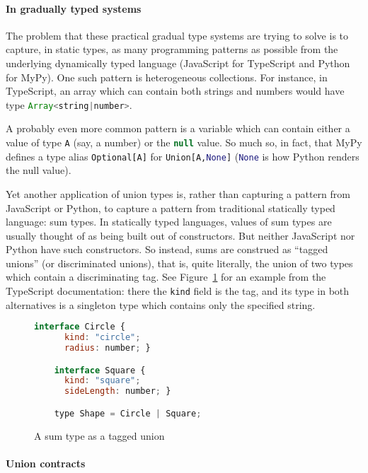\documentclass[sigplan,10pt]{acmart}
\newcommand{\typescript}[1]{\lstinline[language=JavaScript]{#1}}
\newcommand{\python}[1]{\lstinline[language=Python]{#1}}
\begin{document}
\paragraph{In gradually typed systems}

The problem that these practical gradual type systems are trying to solve is to
capture, in static types, as many programming patterns as possible
from the underlying dynamically typed language (JavaScript for
TypeScript and Python for MyPy). One such pattern is
heterogeneous collections. For instance, in TypeScript, an array
which can contain both strings and numbers would have type
\typescript{Array<string|number>}.

A probably even more common pattern is a variable which can contain
either a value of type \typescript{A} (say, a number) or the \typescript{null}
value. So much so, in fact, that MyPy defines a type alias
\python{Optional[A]} for \python{Union[A,None]} (\python{None} is how
Python renders the null value).

Yet another application of union types is, rather than capturing a
pattern from JavaScript or Python, to capture a pattern from
traditional statically typed language: sum types. In statically typed
languages, values of sum types are usually thought of as being built
out of constructors. But neither JavaScript nor Python have such
constructors. So instead, sums are construed as ``tagged unions'' (or
discriminated unions), that is, quite literally, the union of two
types which contain a discriminating tag. See
Figure~\ref{fig:tagged-union} for an example from the TypeScript
documentation: there the \typescript{kind} field is the tag, and its
type in both alternatives is a singleton type which contains only the
specified string.

\begin{figure}
  \centering
  \begin{lstlisting}[language=JavaScript]
    interface Circle {
      kind: "circle";
      radius: number; }

    interface Square {
      kind: "square";
      sideLength: number; }

    type Shape = Circle | Square;
\end{lstlisting}

  \caption{A sum type as a tagged union}
  \label{fig:tagged-union}
\end{figure}

\paragraph{Union contracts}
\end{document}
